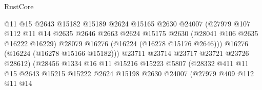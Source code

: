 \begin{lexlean}{RustCore}
\begin{coremodule}
                                        @11
                                        @15
                                        @2643
                                        @15182
                                        @15189
                                        @2624
                                        @15165
                                        @2630
                                        @24007
                                        (@27979
                                          @107
                                          @112
                                          @11
                                          @14
                                          @2635
                                          @2646
                                          @2663
                                          @2624
                                          @15175
                                          @2630
                                          (@28041 @106 @2635 @16222 @16229)
                                          @28079
                                          @16276
                                          (@16224 (@16278 @15176 @2646)))
                                        @16276
                                        (@16224 (@16278 @15166 @15182)))
                                      @23711
                                      @23714
                                      @23717
                                      @23721
                                      @23726
                                      @28612)
                                    (@28456
                                      @1334
                                      @16
                                      @11
                                      @15216
                                      @15223
                                      @5807
                                      (@28332
                                        @411
                                        @11
                                        @15
                                        @2643
                                        @15215
                                        @15222
                                        @2624
                                        @15198
                                        @2630
                                        @24007
                                        (@27979
                                          @409
                                          @112
                                          @11
                                          @14

\end{coremodule}
\end{lexlean}
